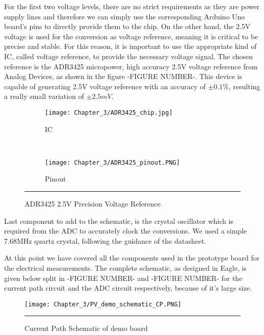 For the first two voltage levels, there are no strict requirements as they are power supply lines and therefore we can simply use the corresponding Arduino Uno board's pins to directly provide them to the chip. On the other hand, the 2.5V voltage is used for the conversion as voltage reference, meaning it is critical to be precise and stable. For this reason, it is important to use the appropriate kind of IC, called voltage reference, to provide the necessary voltage signal. The chosen reference is the ADR3425 micropower, high accuracy 2.5V voltage reference from Analog Devices, as shown in the figure -FIGURE NUMBER-. This device is capable of generating 2.5V voltage reference with an accuracy of $\pm 0.1\%$, resulting a really small variation of $\pm 2.5mV$.\\

\begin{figure}[htbp]
	\centering
	\begin{subfigure}[b]{.2\textwidth}
		\texttt{[image: Chapter\_3/ADR3425\_chip.jpg]}
	    \caption[]{IC}
	    \label{fig:ADR3425_chip}
	\end{subfigure}
    ~
	\begin{subfigure}[b]{.4\textwidth}
		\texttt{[image: Chapter\_3/ADR3425\_pinout.PNG]}
	    \caption[]{Pinout}
	    \label{fig:ADR3425_pinout}
	\end{subfigure}
	\rule{35em}{0.5pt}
	\caption{ADR3425 2.5V Precision Voltage Reference}
	\label{fig:ADR3425}
\end{figure}

Last component to add to the schematic, is the crystal oscillator which is required from the ADC to accurately clock the conversions. We used a simple 7.68MHz quartz crystal, following the guidance of the datasheet.

At this point we have covered all the components used in the prototype board for the electrical measurements. The complete schematic, as designed in Eagle, is given below split in -FIGURE NUMBER- and -FIGURE NUMBER- for the current path circuit and the ADC circuit respectively, because of it's large size.\\

\begin{figure}[p]
	\centering
		\texttt{[image: Chapter\_3/PV\_demo\_schematic\_CP.PNG]}
		\rule{35em}{0.5pt}
	\caption{Current Path Schematic of demo board}
	\label{fig:PV_demo_schematic_CP}
\end{figure}

